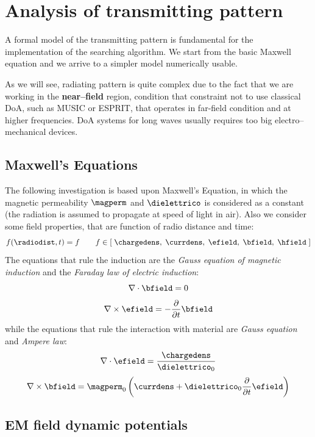 \section{Analysis of transmitting pattern}

A formal model of the transmitting pattern is fundamental for the implementation of the searching algorithm. We start from the basic Maxwell equation and we arrive to a simpler model numerically usable.

As we will see, radiating pattern is quite complex due to the fact that we are working in the \textbf{near--field} region, condition that constraint not to use classical DoA, such as MUSIC or ESPRIT, that operates in far-field condition and at higher frequencies. DoA systems for long waves usually requires too big electro--mechanical devices.

\subsection{Maxwell's Equations}
The following investigation is based upon Maxwell's Equation, in which the magnetic permeability $\magperm$ and $\dielettrico$ is considered as a constant (the radiation is assumed to propagate at speed of light in air). Also we consider some field properties, that are function of radio distance and time:
\[
f(\radiodist,t) = f \qquad f \in \left[\; \chargedens,\; \currdens,\; \efield,\; \bfield,\; \hfield \; \right]
\]
The equations that rule the induction are the \emph{Gauss equation of magnetic induction} and the \emph{Faraday law of electric induction}:
\begin{equation}
\nabla\cdot\bfield = 0
\label{eq:gauss1}
\end{equation}
\begin{equation}
\nabla\times\efield = -\partialt \bfield
\label{eq:faraday}
\end{equation}
while the equations that rule the interaction with material are \emph{Gauss equation} and \emph{Ampere law}:
\begin{equation}
\nabla\cdot\efield = \dfrac{\chargedens}{{\dielettrico}_0}
\label{eq:gauss2}
\end{equation}
\begin{equation}
\nabla\times\bfield = {\magperm}_0 \left( \currdens + {\dielettrico}_0 \partialt \efield \right)
\label{eq:ampere}
\end{equation}

\subsection{EM field dynamic potentials}

